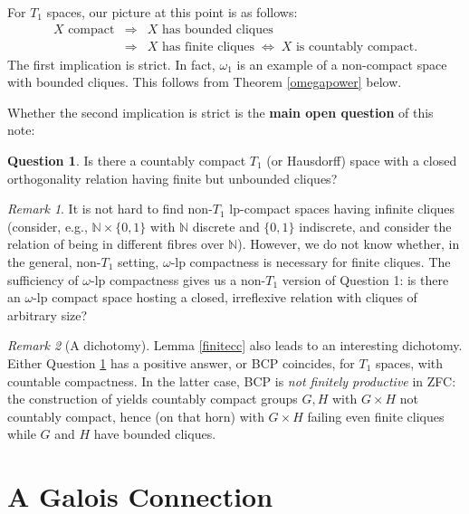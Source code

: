 \documentclass[12pt]{article}
\newcommand{\N}{{\mathbb N}}
\theoremstyle{plain}
\theoremstyle{definition}
\newtheorem{question}{Question}
\theoremstyle{remark}
\newtheorem{remark}{Remark}
\begin{document}
For $T_1$ spaces, our picture at this point is as follows:
\begin{eqnarray*}
\mbox{$X$ compact} & \Rightarrow & \mbox{$X$ has bounded cliques} \\
& \Rightarrow & \mbox{$X$ has finite cliques} \; \Leftrightarrow \;
X \mbox{ is countably compact}.
\end{eqnarray*}
The first implication is strict. { In fact, 
$\omega_1$ is an example of a non-compact space with bounded cliques. This follows from Theorem \ref{omegapower} below.}

Whether the second implication is strict is the {\bf main open question} of this note:

\begin{question}\label{mainq}
Is there a countably compact $T_1$ (or Hausdorff) space with a closed orthogonality relation having finite but unbounded cliques?\\
\end{question}


\begin{remark} It is not hard to find non-$T_1$ lp-compact spaces having infinite cliques (consider, e.g., $\N \times \{0,1\}$ with $\N$ discrete and $\{0,1\}$ indiscrete, and 
consider the relation of being in different fibres over $\N$). However, we do not know whether, in the general, non-$T_1$ setting, $\omega$-lp compactness is necessary for finite cliques.  The sufficiency of $\omega$-lp compactness gives us a non-$T_1$ version of Question 1: 
is there an $\omega$-lp compact space hosting a closed, irreflexive relation with cliques of arbitrary 
size? \\
\end{remark}

\begin{remark}[A dichotomy]\label{dichotomy}
{ Lemma \ref{finitecc}} also leads to an interesting dichotomy. Either Question \ref{mainq} has a positive answer, or  BCP coincides, for $T_1$ spaces, with countable compactness. In the latter case, BCP is {\em not finitely productive} in ZFC: the construction of \cite{HvMRS} yields countably compact groups $G, H$ with $G \times H$ not countably compact, hence (on that horn) with $G \times H$ failing even finite cliques while $G$ and $H$ have bounded cliques. 
\end{remark}



\section{A Galois Connection} 
\end{document}
